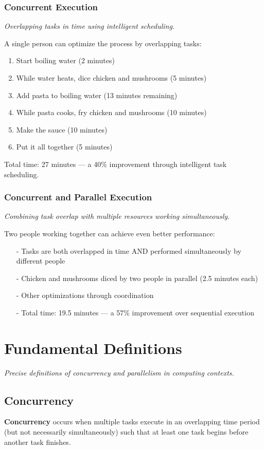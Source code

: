 \documentclass[../../compsys.tex]{subfiles}
\begin{document}
\subsubsection{Concurrent Execution}
\textit{Overlapping tasks in time using intelligent scheduling.}

A single person can optimize the process by overlapping tasks:
\begin{enumerate}
  \item Start boiling water (2 minutes)
  \item While water heats, dice chicken and mushrooms (5 minutes)
  \item Add pasta to boiling water (13 minutes remaining)
  \item While pasta cooks, fry chicken and mushrooms (10 minutes)
  \item Make the sauce (10 minutes)
  \item Put it all together (5 minutes)
\end{enumerate}

Total time: 27 minutes — a 40\% improvement through intelligent task scheduling.

\subsubsection{Concurrent and Parallel Execution}
\textit{Combining task overlap with multiple resources working simultaneously.}

Two people working together can achieve even better performance:
\begin{itemize}
  \item[-] Tasks are both overlapped in time AND performed simultaneously by different people
  \item[-] Chicken and mushrooms diced by two people in parallel (2.5 minutes each)
  \item[-] Other optimizations through coordination
  \item[-] Total time: 19.5 minutes — a 57\% improvement over sequential execution
\end{itemize}

\section{Fundamental Definitions}
\textit{Precise definitions of concurrency and parallelism in computing contexts.}

\subsection{Concurrency}
\textbf{Concurrency} occurs when multiple tasks execute in an overlapping time period (but not necessarily simultaneously) such that at least one task begins before another task finishes.
\end{document}
